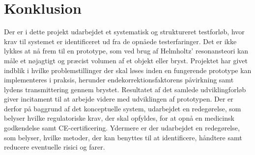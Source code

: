 \chapter{Konklusion}

Der er i dette projekt udarbejdet et systematisk og struktureret testforløb, hvor krav til systemet er identificeret ud fra de opnåede testerfaringer. Det er ikke lykkes at nå frem til en prototype, som ved brug af Helmholtz' resonansteori kan måle et nøjagtigt og præcist volumen af et objekt eller bryst. Projektet har givet indblik i hvilke problemstillinger der skal løses inden en fungerende prototype kan implementeres i praksis, herunder endekorrektionsfaktorens påvirkning samt lydens transmittering gennem brystet. Resultatet af det samlede udviklingforløb giver incitament til at arbejde videre med udviklingen af prototypen. Der er derfor på baggrund af det konceptuelle system, udarbejdet en redegørelse, som belyser hvilke regulatoriske krav, der skal opfyldes, for at opnå en medicinsk godkendelse samt CE-certificering. Ydermere er der udarbejdet en redegørelse, som belyser, hvilke metoder, der kan benyttes til at identificere, håndtere samt reducere eventuelle risici og farer. 
   
